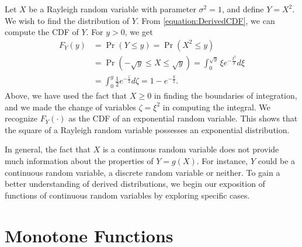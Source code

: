 \begin{example} \label{example:RayleighExponentialRV}
Let $X$ be a Rayleigh  random variable with parameter $\sigma^2  = 1$, and define $Y = X^2$.
We wish to find the distribution of $Y$.
From \eqref{equation:DerivedCDF}, we can compute the CDF of $Y$.
For $y > 0$, we get
\begin{equation*}
\begin{split}
F_Y(y) &= \Pr (Y \leq y) = \Pr \left( X^2 \leq y \right) \\
&= \Pr (- \sqrt{y} \leq X \leq \sqrt{y})
= \int_0^{\sqrt{y}} \xi e^{- \frac{\xi^2}{2}} d\xi \\
&= \int_0^{y} \frac{1}{2} e^{- \frac{\zeta}{2}} d\zeta
= 1 - e^{-\frac{y}{2}} .
\end{split}
\end{equation*}
Above, we have used the fact that $X \geq 0$ in finding the boundaries of integration, and we made the change of variables $\zeta = \xi^2$ in computing the integral.
We recognize $F_Y(\cdot)$ as the CDF of an exponential random variable.
This shows that the square of a Rayleigh random variable possesses an exponential distribution.
\end{example}

In general, the fact that $X$ is a continuous random variable does not provide much information about the properties of $Y = g(X)$.
For instance, $Y$ could be a continuous random variable, a discrete random variable or neither.
To gain a better understanding of derived distributions, we begin our exposition of functions of continuous random variables by exploring specific cases.


\section{Monotone Functions}


